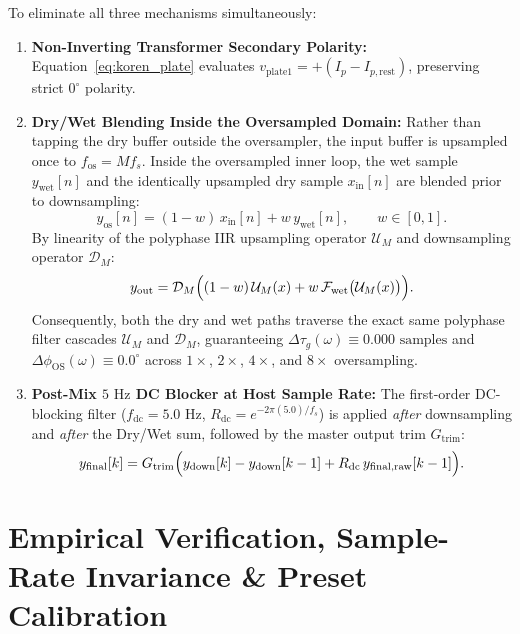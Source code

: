 \documentclass[11pt,a4paper]{article}
\begin{document}
To eliminate all three mechanisms simultaneously:
\begin{enumerate}
    \item \textbf{Non-Inverting Transformer Secondary Polarity:} Equation~\eqref{eq:koren_plate} evaluates $v_{\text{plate1}} = +(I_p - I_{p,\text{rest}})$, preserving strict $0^\circ$ polarity.
    \item \textbf{Dry/Wet Blending Inside the Oversampled Domain:} Rather than tapping the dry buffer outside the oversampler, the input buffer is upsampled once to $f_{\text{os}} = M f_s$. Inside the oversampled inner loop, the wet sample $y_{\text{wet}}[n]$ and the identically upsampled dry sample $x_{\text{in}}[n]$ are blended prior to downsampling:
    \begin{equation}
        y_{\text{os}}[n] = (1 - w)\,x_{\text{in}}[n] + w\,y_{\text{wet}}[n], \qquad w \in [0, 1].
    \end{equation}
    By linearity of the polyphase IIR upsampling operator $\mathcal{U}_M$ and downsampling operator $\mathcal{D}_M$:
    \begin{equation}
        y_{\text{out}} = \mathcal{D}_M\Bigl((1 - w)\,\mathcal{U}_M(x) + w\,\mathcal{F}_{\text{wet}}\bigl(\mathcal{U}_M(x)\bigr)\Bigr).
    \end{equation}
    Consequently, both the dry and wet paths traverse the exact same polyphase filter cascades $\mathcal{U}_M$ and $\mathcal{D}_M$, guaranteeing $\Delta\tau_g(\omega) \equiv 0.000\text{ samples}$ and $\Delta\phi_{\text{OS}}(\omega) \equiv 0.0^\circ$ across $1\times$, $2\times$, $4\times$, and $8\times$ oversampling.
    \item \textbf{Post-Mix $5\text{ Hz}$ DC Blocker at Host Sample Rate:} The first-order DC-blocking filter ($f_{\text{dc}} = 5.0\text{ Hz}$, $R_{\text{dc}} = e^{-2\pi(5.0)/f_s}$) is applied \emph{after} downsampling and \emph{after} the Dry/Wet sum, followed by the master output trim $G_{\text{trim}}$:
    \begin{equation}
        y_{\text{final}}[k] = G_{\text{trim}}\Bigl(y_{\text{down}}[k] - y_{\text{down}}[k-1] + R_{\text{dc}}\,y_{\text{final,raw}}[k-1]\Bigr).
    \end{equation}
\end{enumerate}

\section{Empirical Verification, Sample-Rate Invariance \& Preset Calibration}
\end{document}

